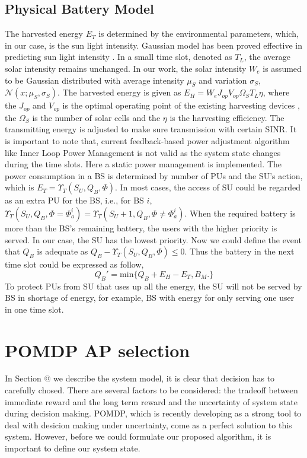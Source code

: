 \documentclass[conference]{IEEEtran}
\makeatletter
\newcommand{\Rmnum}[1]{\expandafter\@slowromancap\romannumeral #1@}
\makeatother
\begin{document}
\subsection{Physical Battery Model}
The harvested energy \(E_T\) is determined by the environmental parameters,
which, in our case, is the sun light intensity.
Gaussian model has been proved effective in predicting sun light intensity \cite{gaussian,data}.
In a small time slot, denoted as \(T_L\), the average solar intensity remains unchanged.
In our work, the solar intensity \(W_e\) is assumed to be
Gaussian distributed with average intensity \(\mu_S\) and variation \(\sigma_S\), \(\mathcal{N}\left(x;\mu_S,\sigma_S\right)\).
The harvested energy is given as \(E_H = W_eJ_{op}V_{op}\Omega_ST_L\eta\),
where the \(J_{op}\) and \(V_{op}\) is the optimal operating point of the existing harvesting devices \cite{physic},
the \(\Omega_S\) is the number of solar cells and the \(\eta\) is the harvesting efficiency.
The transmitting energy is adjusted to make sure transmission with certain SINR.
It is important to note that, current feedback-based power adjustment algorithm
like Inner Loop Power Management is not valid as the system state changes during the time slots.
Here a static power management is implemented.
The power consumption in a BS is determined by number of PUs and the SU's action, 
which is \(E_T = \Upsilon_T(S_U, Q_B, \Phi)\).
In most cases, the access of SU could be regarded as an extra PU for the BS, i.e., for BS \(i\),
\(\Upsilon_T(S_U, Q_B, \Phi = \Phi_{a}^{i}) = \Upsilon_T(S_U + 1, Q_B, \Phi \ne \Phi_{a}^i)\).
When the required battery is more than the BS's remaining battery,
the users with the higher priority is served.
In our case, the SU has the lowest priority.
Now we could define the event that \(Q_B\) is adequate as \(Q_B- \Upsilon_T(S_U, Q_B, \Phi) \leq 0\).
Thus the battery in the next time slot could be expressed as follow,
\begin{equation}
	Q_B' = \mbox{min}\{Q_B + E_H - E_T, B_M.\}
\end{equation}
To protect PUs from SU that uses up all the energy, the SU will not be served by BS in shortage of energy, 
for example, BS with energy for only serving one user in one time slot.
\section{POMDP AP selection}
In Section \Rmnum{2} we describe the system model, it is clear that decision has to carefully chosed.
There are several factors to be considered: the tradeoff between immediate reward and the long term reward and
the uncertainty of system state during decision making.
POMDP, which is recently developing as a strong tool to deal with desicion making under uncertainty,
come as a perfect solution to this system.
However, before we could formulate our proposed algorithm, it is important to define our system state.
\end{document}
